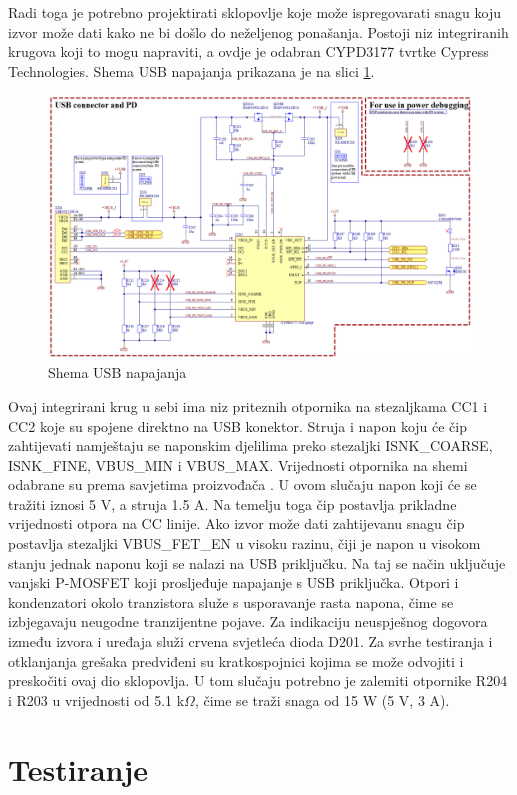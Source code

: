 Radi toga je potrebno projektirati sklopovlje koje može ispregovarati snagu koju izvor može dati kako ne bi došlo do neželjenog ponašanja. Postoji niz integriranih krugova koji to mogu napraviti, a ovdje je odabran CYPD3177 tvrtke Cypress Technologies. Shema USB napajanja prikazana je na slici \ref{slk:MB_USB}.
\begin{figure}
    \centering
    \includegraphics[width=1\textwidth]{Figures/MB_USB.png}
    \caption{Shema USB napajanja}
    \label{slk:MB_USB}
\end{figure}
Ovaj integrirani krug u sebi ima niz priteznih otpornika na stezaljkama CC1 i CC2 koje su spojene direktno na USB konektor. Struja i napon koju će čip zahtijevati namještaju se naponskim djelilima preko stezaljki ISNK\_COARSE, ISNK\_FINE, VBUS\_MIN i VBUS\_MAX. Vrijednosti otpornika na shemi odabrane su prema savjetima proizvođača \cite{ct:usb}. U ovom slučaju napon koji će se tražiti iznosi 5 V, a struja 1.5 A. Na temelju toga čip postavlja prikladne vrijednosti otpora na CC linije. Ako izvor može dati zahtijevanu snagu čip postavlja stezaljki VBUS\_FET\_EN u visoku razinu, čiji je napon u visokom stanju jednak naponu koji se nalazi na USB priključku. Na taj se način uključuje vanjski P-MOSFET koji prosljeđuje napajanje s USB priključka. Otpori i kondenzatori okolo tranzistora služe s usporavanje rasta napona, čime se izbjegavaju neugodne tranzijentne pojave. Za indikaciju neuspješnog dogovora između izvora i uređaja služi crvena svjetleća dioda D201. Za svrhe testiranja i otklanjanja grešaka predviđeni su kratkospojnici kojima se može odvojiti i preskočiti ovaj dio sklopovlja. U tom slučaju potrebno je zalemiti otpornike R204 i R203 u vrijednosti od 5.1 k$\Omega$, čime se traži snaga od 15 W (5 V, 3 A).

\section{Testiranje}
